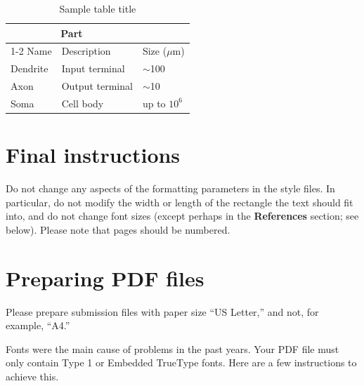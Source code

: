 \documentclass{article}
\begin{document}
\begin{table}
  \caption{Sample table title}
  \label{sample-table}
  \centering
  \begin{tabular}{lll}
    \toprule
    \multicolumn{2}{c}{Part}                   \\
    \cmidrule(r){1-2}
    Name     & Description     & Size ($\mu$m) \\
    \midrule
    Dendrite & Input terminal  & $\sim$100     \\
    Axon     & Output terminal & $\sim$10      \\
    Soma     & Cell body       & up to $10^6$  \\
    \bottomrule
  \end{tabular}
\end{table}

\section{Final instructions}

Do not change any aspects of the formatting parameters in the style files.  In
particular, do not modify the width or length of the rectangle the text should
fit into, and do not change font sizes (except perhaps in the
\textbf{References} section; see below). Please note that pages should be
numbered.

\section{Preparing PDF files}

Please prepare submission files with paper size ``US Letter,'' and not, for
example, ``A4.''

Fonts were the main cause of problems in the past years. Your PDF file must only
contain Type 1 or Embedded TrueType fonts. Here are a few instructions to
achieve this.
\end{document}
